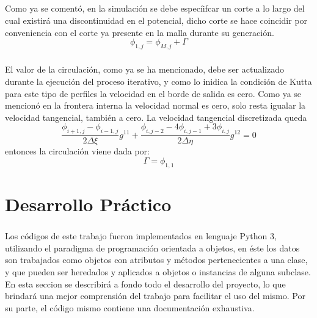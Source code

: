 \documentclass[letterpaper, openright, 12pt]{book}
\begin{document}
    \paragraph*{}
        Como ya se comentó, en la simulación se debe especíifcar un corte a lo
        largo del cual existirá una discontinuidad en el potencial, dicho corte
        se hace coincidir por conveniencia con el corte ya presente en la malla
        durante su generación.
        \begin{equation}
            \phi_{1, j} = \phi_{M, j} + \Gamma
        \end{equation}

    \paragraph*{}
        El valor de la circulación, como ya se ha mencionado, debe ser
        actualizado durante la ejecución del proceso iterativo, y como lo
        inidica la condición de Kutta para este tipo de perfiles la velocidad
        en el borde de salida es cero. Como ya se mencionó en la frontera
        interna la velocidad normal es cero, solo resta igualar la velocidad
        tangencial, también a cero. La velocidad tangencial discretizada queda
        \begin{equation}
            \frac{\phi_{i+1, j} - \phi_{i-1, j}}{2 \Delta \xi} g^{11}
            + \frac{\phi_{i, j-2} - 4 \phi_{i, j-1} + 3 \phi_{i, j}}{2 \Delta \eta}
                g^{12} = 0
        \end{equation}
        entonces la circulación viene dada por:
        \begin{equation}
            \Gamma = \phi_{1, 1}
        \end{equation}

%
%
%
%
%

%
%
%
%
%

\chapter{Desarrollo Práctico}
    \paragraph*{}
    Los códigos de este trabajo fueron implementados en lenguaje Python 3,
    utilizando el paradigma de programación orientada a objetos, en éste los
    datos son trabajados como objetos con atributos y métodos pertenecientes
    a una clase, y que pueden ser heredados y aplicados a objetos o
    instancias de alguna subclase. En esta seccion se describirá a fondo todo
    el desarrollo del proyecto, lo que brindará una mejor comprensión del
    trabajo para facilitar el uso del mismo. Por su parte, el código mismo
    contiene una documentación exhaustiva.
\end{document}
